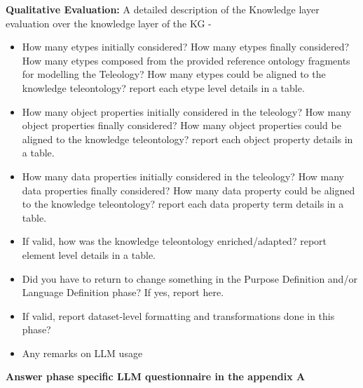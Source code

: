 \noindent \textbf{Qualitative Evaluation:} A detailed description of the Knowledge layer evaluation over the knowledge layer of the KG -
\begin{itemize}
    \item How many etypes initially considered? How many etypes finally considered? How many etypes composed from the provided reference ontology fragments for modelling the Teleology? How many etypes could be aligned to the  knowledge teleontology? report each etype level details in a table.
    \item How many object properties initially considered in the teleology? How many object properties finally considered? How many object properties could be aligned to the knowledge teleontology? report each object property details in a table.
    \item How many data properties initially considered in the teleology? How many data properties finally considered?  How many data property could be aligned to the knowledge teleontology? report each data property term details in a table.
    \item If valid, how was the knowledge teleontology enriched/adapted? report element level details in a table.
    \item Did you have to return to change something in the Purpose Definition and/or Language Definition phase? If yes, report here.
    \item If valid, report dataset-level formatting and transformations done in this phase?
    \item Any remarks on LLM usage
\end{itemize}

\noindent \textbf{Answer phase specific LLM questionnaire in the appendix A}